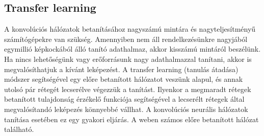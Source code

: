\subsection{Transfer learning}

A konvolúciós hálózatok betanításához nagyszámú mintára és nagyteljesítményű számítógépekre van szükség. Amennyiben nem áll rendelkezésünkre nagyjából egymillió képkockából álló tanító adathalmaz, akkor kisszámú mintáról beszélünk. Ha nincs lehetőségünk vagy erőforrásunk nagy adathalmazzal tanítani, akkor is megvalósíthatjuk a kívánt leképezést. A transfer learning (tanulás átadása) módszer segítségével egy előre betanított hálózatot veszünk alapul, és annak utolsó pár rétegét lecserélve végezzük a tanítást. Ilyenkor a megmaradt rétegek betanított tulajdonság érzékelő funkciója segítségével a lecserélt rétegek által megvalósítandó leképezés könnyebbé vállhat. A konvolúciós neurális hálózatok tanítása esetében ez egy gyakori eljárás. A weben számos előre betanított hálózat található.

